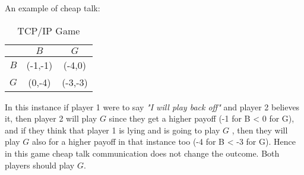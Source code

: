 \documentclass[../../main.tex]{subfiles}
\begin{document}
        An example of cheap talk: 
        \begin{table}[h]
            \centering
            \begin{tabular}{c|c c}
                    & $B$       & $G$ \\
                    \hline
                 $B$  & (-1,-1)    & (-4,0) \\
                 $G$  & (0,-4)    & (-3,-3)
            \end{tabular}
            \caption{TCP/IP Game}
            \label{tab:TCP_IP_GAME}
        \end{table}
        
        In this instance if player 1 were to say \textit{"I will play back off"} and player 2 believes it, then player 2 will play $G$ since they get a higher payoff (-1 for B < 0 for G), and if they think that player 1 is lying and is going to play $G$ , then they will play $G$ also for a higher payoff in that instance too (-4 for B < -3 for G). Hence in this game cheap talk communication does not change the outcome. Both players should play $G$.
\end{document}
